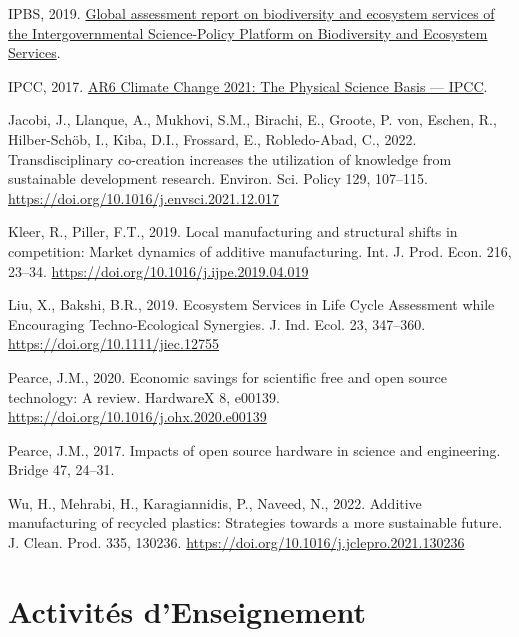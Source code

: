 \documentclass[
  12pt,
  oneside]{book}
\newlength{\cslhangindent}
\newlength{\cslentryspacingunit} %
\newenvironment{CSLReferences}[2] %
 {%
  \setlength{\parindent}{0pt}
  \ifodd #1
  \let\oldpar\par
  \def\par{\hangindent=\cslhangindent\oldpar}
  \fi
  \setlength{\parskip}{#2\cslentryspacingunit}
 }%
 {}
\begin{document}
\begin{CSLReferences}{1}{0}
\leavevmode{}%
IPBS, 2019. \href{https://ipbes.net/global-assessment\%7B/\%\%7D0Ahttps://ipbes.net/global-assessment-report-biodiversity-ecosystem-services}{{Global assessment report on biodiversity and ecosystem services of the Intergovernmental Science-Policy Platform on Biodiversity and Ecosystem Services}}.

\leavevmode{}%
IPCC, 2017. \href{https://www.ipcc.ch/report/sixth-assessment-report-working-group-i/}{{AR6 Climate Change 2021: The Physical Science Basis --- IPCC}}.

\leavevmode{}%
Jacobi, J., Llanque, A., Mukhovi, S.M., Birachi, E., Groote, P. von, Eschen, R., Hilber-Schöb, I., Kiba, D.I., Frossard, E., Robledo-Abad, C., 2022. {Transdisciplinary co-creation increases the utilization of knowledge from sustainable development research}. Environ. Sci. Policy 129, 107--115. \url{https://doi.org/10.1016/j.envsci.2021.12.017}

\leavevmode{}%
Kleer, R., Piller, F.T., 2019. {Local manufacturing and structural shifts in competition: Market dynamics of additive manufacturing}. Int. J. Prod. Econ. 216, 23--34. \url{https://doi.org/10.1016/j.ijpe.2019.04.019}

\leavevmode{}%
Liu, X., Bakshi, B.R., 2019. {Ecosystem Services in Life Cycle Assessment while Encouraging Techno‐Ecological Synergies}. J. Ind. Ecol. 23, 347--360. \url{https://doi.org/10.1111/jiec.12755}

\leavevmode{}%
Pearce, J.M., 2020. {Economic savings for scientific free and open source technology: A review}. HardwareX 8, e00139. \url{https://doi.org/10.1016/j.ohx.2020.e00139}

\leavevmode{}%
Pearce, J.M., 2017. {Impacts of open source hardware in science and engineering}. Bridge 47, 24--31.

\leavevmode{}%
Wu, H., Mehrabi, H., Karagiannidis, P., Naveed, N., 2022. {Additive manufacturing of recycled plastics: Strategies towards a more sustainable future}. J. Clean. Prod. 335, 130236. \url{https://doi.org/10.1016/j.jclepro.2021.130236}

\end{CSLReferences}

\hypertarget{activituxe9s-denseignement}{%
\chapter{Activités d'Enseignement}\label{activituxe9s-denseignement}}
\end{document}
